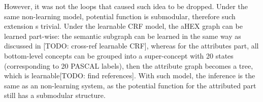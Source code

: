 \documentclass[11pt,a4paper]{article}
\begin{document}
However, it was not the loops that caused such idea to be dropped. Under the same non-learning model, potential function is submodular, therefore such extension s trivial. Under the learnable CRF model, the aHEX graph can be learned part-wise: the semantic subgraph can be learned in the same way as discussed in [TODO: cross-ref learnable CRF], whereas for the attributes part, all bottom-level concepts can be grouped into a super-concept with 20 states (corresponding to 20 PASCAL labels), then the attribute graph becomes a tree, which is learnable[TODO: find references]. With such model, the inference is the same as an non-learning system, as the potential function for the attributed part still has a submodular structure.

\clearpage


\end{document}
